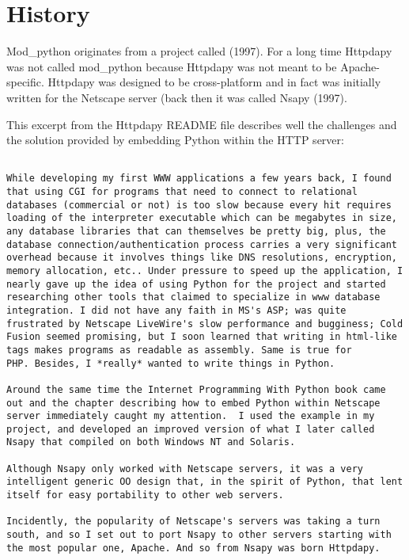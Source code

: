 \section{History\label{intr-history}}

Mod_python originates from a project called
(1997). For a long time Httpdapy was not called mod_python because
Httpdapy was not meant to be Apache-specific. Httpdapy was designed to
be cross-platform and in fact was initially written for the Netscape
server (back then it was called Nsapy (1997).

This excerpt from the Httpdapy README file describes well the
challenges and the solution provided by embedding Python within the
HTTP server:

\begin{verbatim}

While developing my first WWW applications a few years back, I found
that using CGI for programs that need to connect to relational
databases (commercial or not) is too slow because every hit requires
loading of the interpreter executable which can be megabytes in size,
any database libraries that can themselves be pretty big, plus, the
database connection/authentication process carries a very significant
overhead because it involves things like DNS resolutions, encryption,
memory allocation, etc.. Under pressure to speed up the application, I
nearly gave up the idea of using Python for the project and started
researching other tools that claimed to specialize in www database
integration. I did not have any faith in MS's ASP; was quite
frustrated by Netscape LiveWire's slow performance and bugginess; Cold
Fusion seemed promising, but I soon learned that writing in html-like
tags makes programs as readable as assembly. Same is true for
PHP. Besides, I *really* wanted to write things in Python.

Around the same time the Internet Programming With Python book came
out and the chapter describing how to embed Python within Netscape
server immediately caught my attention.  I used the example in my
project, and developed an improved version of what I later called
Nsapy that compiled on both Windows NT and Solaris.

Although Nsapy only worked with Netscape servers, it was a very
intelligent generic OO design that, in the spirit of Python, that lent
itself for easy portability to other web servers.

Incidently, the popularity of Netscape's servers was taking a turn
south, and so I set out to port Nsapy to other servers starting with
the most popular one, Apache. And so from Nsapy was born Httpdapy.

\end{verbatim}

